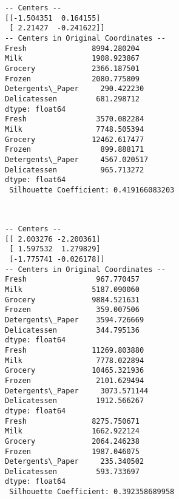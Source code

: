 \documentclass{article}
\begin{document}
    \begin{Verbatim}[commandchars=\\\{\}]
-- Centers --
[[-1.504351  0.164155]
 [ 2.21427  -0.241622]]
-- Centers in Original Coordinates --
Fresh               8994.280204
Milk                1908.923867
Grocery             2366.187501
Frozen              2080.775809
Detergents\_Paper     290.422230
Delicatessen         681.298712
dtype: float64
Fresh                3570.082284
Milk                 7748.505394
Grocery             12462.617477
Frozen                899.888171
Detergents\_Paper     4567.020517
Delicatessen          965.713272
dtype: float64
 Silhouette Coefficient: 0.419166083203
    \end{Verbatim}

    \begin{center}
    \end{center}
    { \hspace*{\fill} \\}
    
    \begin{Verbatim}[commandchars=\\\{\}]
-- Centers --
[[ 2.003276 -2.200361]
 [ 1.597532  1.279829]
 [-1.775741 -0.026178]]
-- Centers in Original Coordinates --
Fresh                967.770457
Milk                5187.090060
Grocery             9884.521631
Frozen               359.007506
Detergents\_Paper    3594.726669
Delicatessen         344.795136
dtype: float64
Fresh               11269.803880
Milk                 7778.022894
Grocery             10465.321936
Frozen               2101.629494
Detergents\_Paper     3073.571144
Delicatessen         1912.566267
dtype: float64
Fresh               8275.750671
Milk                1662.922124
Grocery             2064.246238
Frozen              1987.046075
Detergents\_Paper     235.340502
Delicatessen         593.733697
dtype: float64
 Silhouette Coefficient: 0.392358689958
    \end{Verbatim}

    \begin{center}
    \end{center}
    { \hspace*{\fill} \\}
    
\end{document}

